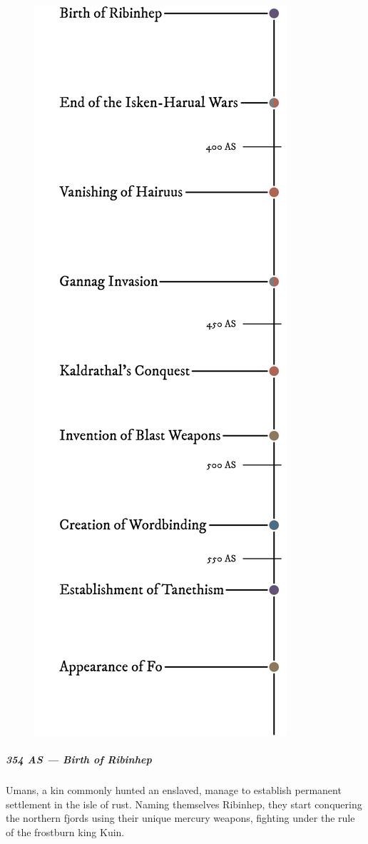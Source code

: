 \begin{linenumbers}
\begin{figure}[H]
    \centering \includegraphics{01intro/img/30history_v.png}
\end{figure}

\subparagraph{354 AS --- Birth of Ribinhep} Umans, a kin commonly hunted an enslaved, manage to establish permanent settlement in the isle of rust.
Naming themselves Ribinhep, they start conquering the northern fjords using their unique mercury weapons, fighting under the rule of the frostburn king Kuin.


\end{linenumbers}
